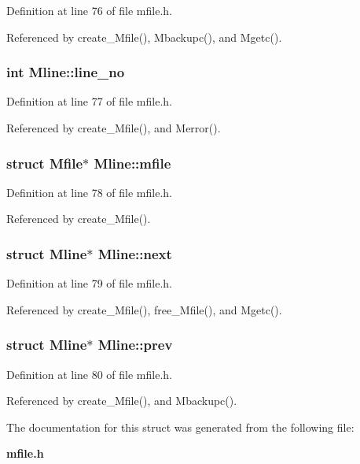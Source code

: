 Definition at line 76 of file mfile.h.

Referenced by create\_\-Mfile(), Mbackupc(), and Mgetc().
\subsubsection{\setlength{\rightskip}{0pt plus 5cm}int \bf{Mline::line\_\-no}}\label{structMline_725edbe260fb235a7ed7fe6ccf0baa09}




Definition at line 77 of file mfile.h.

Referenced by create\_\-Mfile(), and Merror().
\subsubsection{\setlength{\rightskip}{0pt plus 5cm}struct \bf{Mfile}$\ast$ \bf{Mline::mfile}}\label{structMline_6153656e6f53092d65a9fd61a6edacf1}




Definition at line 78 of file mfile.h.

Referenced by create\_\-Mfile().
\subsubsection{\setlength{\rightskip}{0pt plus 5cm}struct \bf{Mline}$\ast$ \bf{Mline::next}}\label{structMline_e9a962a3e476f9c45c15c491cd15a733}




Definition at line 79 of file mfile.h.

Referenced by create\_\-Mfile(), free\_\-Mfile(), and Mgetc().
\subsubsection{\setlength{\rightskip}{0pt plus 5cm}struct \bf{Mline}$\ast$ \bf{Mline::prev}}\label{structMline_f506ac9c5c0d8c412833727f43724e18}




Definition at line 80 of file mfile.h.

Referenced by create\_\-Mfile(), and Mbackupc().

The documentation for this struct was generated from the following file:\begin{CompactItemize}
\item 
\bf{mfile.h}\end{CompactItemize}
